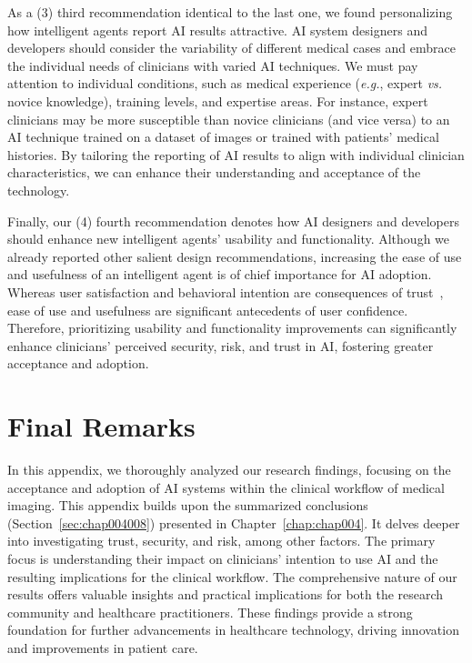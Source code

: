 As a (3) third recommendation identical to the last one, we found personalizing how intelligent agents report \ac{AI} results attractive.
\ac{AI} system designers and developers should consider the variability of different medical cases and embrace the individual needs of clinicians with varied \ac{AI} techniques.
We must pay attention to individual conditions, such as medical experience ({\it e.g.}, expert {\it vs.} novice knowledge), training levels, and expertise areas.
For instance, expert clinicians may be more susceptible than novice clinicians (and vice versa) to an \ac{AI} technique trained on a dataset of images or trained with patients' medical histories.
By tailoring the reporting of \ac{AI} results to align with individual clinician characteristics, we can enhance their understanding and acceptance of the technology.

Finally, our (4) fourth recommendation denotes how \ac{AI} designers and developers should enhance new intelligent agents' usability and functionality.
Although we already reported other salient design recommendations, increasing the ease of use and usefulness of an intelligent agent is of chief importance for \ac{AI} adoption.
Whereas user satisfaction and behavioral intention are consequences of trust~\cite{LIU2022107026, LV2022106993}, ease of use and usefulness are significant antecedents of user confidence.
Therefore, prioritizing usability and functionality improvements can significantly enhance clinicians' perceived security, risk, and trust in \ac{AI}, fostering greater acceptance and adoption.

\section{Final Remarks}
\label{chap:app002006}

In this appendix, we thoroughly analyzed our research findings, focusing on the acceptance and adoption of \ac{AI} systems within the clinical workflow of medical imaging.
This appendix builds upon the summarized conclusions (Section~\ref{sec:chap004008}) presented in Chapter~\ref{chap:chap004}.
It delves deeper into investigating trust, security, and risk, among other factors.
The primary focus is understanding their impact on clinicians' intention to use \ac{AI} and the resulting implications for the clinical workflow.
The comprehensive nature of our results offers valuable insights and practical implications for both the research community and healthcare practitioners.
These findings provide a strong foundation for further advancements in healthcare technology, driving innovation and improvements in patient care.

